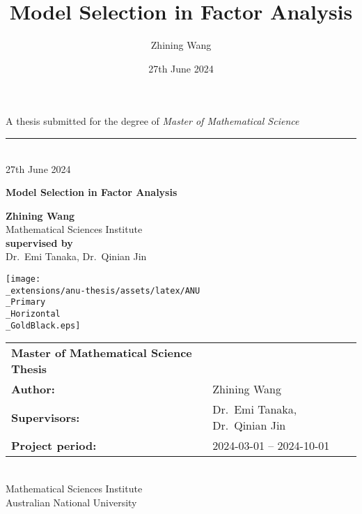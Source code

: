 \documentclass[
  a4paper,
  oneside,
  openany,
  12pt,
  onecolumn]{book}
\title{Model Selection in Factor Analysis}
\author{Zhining Wang}
\date{27th June 2024}
\theoremstyle{plain}
\theoremstyle{remark}
\begin{document}
  \begin{frontmatter}
  \begin{titlepage}

  \begin{titlepage}
    \begin{flushright}%
      \vspace{50mm}
      {\small A thesis submitted for the degree of {\it Master of
  Mathematical Science}}
      \rule[1ex]{\textwidth}{1pt}\\
      {\fontsize{9}{0} 27th June 2024}\\
      \vspace{25mm}
      {\fontsize{40}{44}\bfseries Model Selection in Factor
  Analysis\par}
        \vspace{12mm}
        \vfill
      {\fontsize{20}{0}\bfseries Zhining Wang}\\
      \vspace{2mm}
      {\fontsize{8}{0} Mathematical Sciences Institute}\\
      \vspace{35mm}
      {\fontsize{10}{0}\bfseries supervised by}\\
      Dr.~Emi Tanaka, Dr.~Qinian Jin
      
      \vspace{2.0cm}
  		\texttt{[image: \\\_extensions/anu-thesis/assets/latex/ANU\\\_Primary\\\_Horizontal\\\_GoldBlack.eps]}\\
   \end{flushright}%

   \clearpage\thispagestyle{empty}
   \normalfont
   \vspace*{\fill}
   \noindent
   \begin{tabular}{lp{10cm}}
     {\bf Master of Mathematical Science Thesis} & \\[2mm]
     {\bf Author:} & Zhining Wang\\[2mm]
     {\bf Supervisors:} & Dr.~Emi Tanaka, Dr.~Qinian Jin\\[2mm]
     
     {\bf Project period:} & 2024-03-01 -- 2024-10-01 \\[2mm]
   \end{tabular}\\[2mm]

  \noindent Mathematical Sciences Institute\\
  \noindent Australian National University

  \end{titlepage}
  \setlength{\parindent}{0pt}
  \setlength{\parskip}{1ex plus 0.5ex minus 0.2ex}








  \end{titlepage}
  \end{frontmatter}
\end{document}
